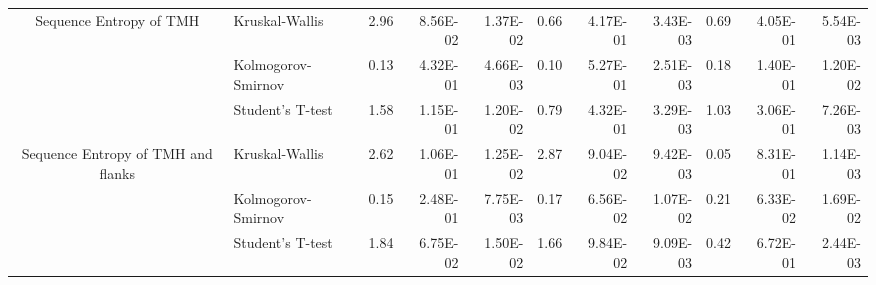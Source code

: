 \begin{table}[htbp]
\begin{tabular}{clrrrrrrrrr}
	\multirow{3}[0]{*}{Sequence Entropy of TMH } &  Kruskal-Wallis & 2.96  & 8.56E-02 & 1.37E-02 & 0.66  & 4.17E-01 & 3.43E-03 & 0.69  & 4.05E-01 & 5.54E-03 \\
							&  Kolmogorov-Smirnov & 0.13  & 4.32E-01 & 4.66E-03 & 0.10  & 5.27E-01 & 2.51E-03 & 0.18  & 1.40E-01 & 1.20E-02 \\
							&  Student's T-test & 1.58  & 1.15E-01 & 1.20E-02 & 0.79  & 4.32E-01 & 3.29E-03 & 1.03  & 3.06E-01 & 7.26E-03 \\
	\multirow{3}[0]{*}{Sequence Entropy of TMH and flanks } &  Kruskal-Wallis & 2.62  & 1.06E-01 & 1.25E-02 & 2.87  & 9.04E-02 & 9.42E-03 & 0.05  & 8.31E-01 & 1.14E-03 \\
							&  Kolmogorov-Smirnov & 0.15  & 2.48E-01 & 7.75E-03 & 0.17  & 6.56E-02 & 1.07E-02 & 0.21  & 6.33E-02 & 1.69E-02 \\
							&  Student's T-test & 1.84  & 6.75E-02 & 1.50E-02 & 1.66  & 9.84E-02 & 9.09E-03 & 0.42  & 6.72E-01 & 2.44E-03 \\
	\end{tabular}%
					\label{table:organellesswissstats}
	\end{table}%


